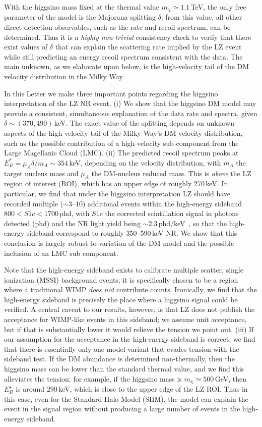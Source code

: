 \documentclass[reprint,superscriptaddress,preprintnumbers,amsmath,amssymb,aps,prd,tightenlines,longbibliography,nofootinbib]{revtex4-2}
\begin{document}
With the higgsino mass fixed at the thermal value $m_\chi \simeq 1.1$\,TeV, the only free parameter of the model is the Majorana splitting $\delta$; from this value, all other direct detection observables, such as the rate and recoil spectrum, can be determined. Thus it is a \textit{highly non-trivial} consistency check to verify that there exist values of $\delta$ that can explain the scattering rate implied by the LZ event while still predicting an energy recoil spectrum consistent with the data. The main unknown, as we elaborate upon below, is the high-velocity tail of the DM velocity distribution in the Milky Way.

In this Letter we make three important points regarding the higgsino interpretation of the LZ NR event. 
(i) We show that the higgsino DM model may provide a consistent, simultaneous explanation of the data rate and spectra, given $\delta \sim (370,490)$\,keV.
The exact value of the splitting depends on unknown aspects of the high-velocity tail of the Milky Way's DM velocity distribution, such as the possible contribution of a high-velocity sub-component from the Large Magellanic Cloud (LMC).  (ii) The predicted recoil spectrum peaks at
$E_R^* = \mu_A \delta / m_A \sim 354$\,keV, depending on the velocity distribution, with $m_A$ the target nucleus mass and $\mu_A$ the DM-nucleus reduced mass. This is {\it above} the LZ region of interest (ROI), which has an upper edge of roughly 270\,keV. In particular, we find that under the higgsino interpretation LZ should have recorded 
multiple ($\sim$3--10) additional events within the high-energy sideband $800 < S1c < 1700$\,phd, with $S1c$ the corrected scintillation signal in photons detected (phd) and the NR light yield being $\sim$$2.3$\,phd/keV~\cite{LZ:2026axp}, so that the high-energy sideband correspond to roughly $350$--$590$\,keV NR.   We show that this conclusion is largely robust to variation of the DM model and the possible inclusion of an LMC sub component.  

Note that the high-energy sideband exists to calibrate multiple scatter, single ionization (MSSI) background events; it is specifically chosen to be a region where a traditional WIMP {\it does not} contribute counts. Ironically, we find that the high-energy sideband is precisely the place where a higgsino signal could be verified. A central caveat to our results, however, is that LZ does not publish the acceptance for WIMP-like events in this sideband; we assume unit acceptance, but if that is substantially lower it would relieve the tension we point out. 
(iii) If our assumption for the acceptance in the high-energy sideband is correct, we find that there is essentially only one model variant that evades tension with the sideband test.
If the DM abundance is determined non-thermally, then the higgsino mass can be lower than the standard thermal value, and we find this alleviates the tension; for example, if the higgsino mass is $m_\chi \simeq 500$\,GeV, then $E_R^\star$
is around $290$\,keV, which is close to the upper edge of the LZ ROI. Thus in this case, even for the Standard Halo Model (SHM), the model can explain the event in the signal region without producing a large number of events in the high-energy sideband.
\end{document}
